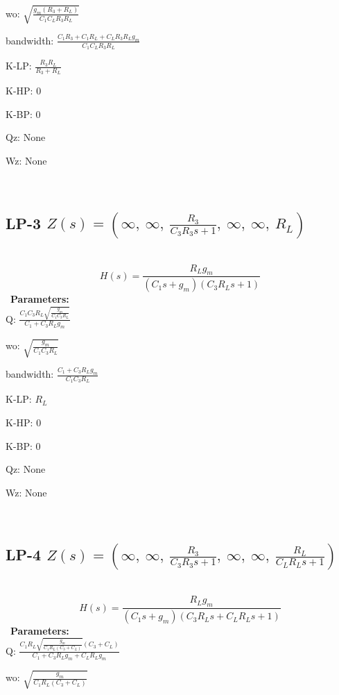 \documentclass{article}
\begin{document}
wo: $\sqrt{\frac{g_{m} \left(R_{3} + R_{L}\right)}{C_{1} C_{L} R_{3} R_{L}}}$\ 

bandwidth: $\frac{C_{1} R_{3} + C_{1} R_{L} + C_{L} R_{3} R_{L} g_{m}}{C_{1} C_{L} R_{3} R_{L}}$\ 

K-LP: $\frac{R_{3} R_{L}}{R_{3} + R_{L}}$\ 

K-HP: $0$\ 

K-BP: $0$\ 

Qz: $\text{None}$\ 

Wz: $\text{None}$\ 

\ 

\subsection{LP-3 $Z(s) = \left( \infty, \  \infty, \  \frac{R_{3}}{C_{3} R_{3} s + 1}, \  \infty, \  \infty, \  R_{L}\right)$ } \ 
\textbf{\[H(s) = \frac{R_{L} g_{m}}{\left(C_{1} s + g_{m}\right) \left(C_{3} R_{L} s + 1\right)}\] } \ 
\textbf{Parameters:}\\ 

Q: $\frac{C_{1} C_{3} R_{L} \sqrt{\frac{g_{m}}{C_{1} C_{3} R_{L}}}}{C_{1} + C_{3} R_{L} g_{m}}$\ 

wo: $\sqrt{\frac{g_{m}}{C_{1} C_{3} R_{L}}}$\ 

bandwidth: $\frac{C_{1} + C_{3} R_{L} g_{m}}{C_{1} C_{3} R_{L}}$\ 

K-LP: $R_{L}$\ 

K-HP: $0$\ 

K-BP: $0$\ 

Qz: $\text{None}$\ 

Wz: $\text{None}$\ 

\ 

\subsection{LP-4 $Z(s) = \left( \infty, \  \infty, \  \frac{R_{3}}{C_{3} R_{3} s + 1}, \  \infty, \  \infty, \  \frac{R_{L}}{C_{L} R_{L} s + 1}\right)$ } \ 
\textbf{\[H(s) = \frac{R_{L} g_{m}}{\left(C_{1} s + g_{m}\right) \left(C_{3} R_{L} s + C_{L} R_{L} s + 1\right)}\] } \ 
\textbf{Parameters:}\\ 

Q: $\frac{C_{1} R_{L} \sqrt{\frac{g_{m}}{C_{1} R_{L} \left(C_{3} + C_{L}\right)}} \left(C_{3} + C_{L}\right)}{C_{1} + C_{3} R_{L} g_{m} + C_{L} R_{L} g_{m}}$\ 

wo: $\sqrt{\frac{g_{m}}{C_{1} R_{L} \left(C_{3} + C_{L}\right)}}$\ 
\end{document}

